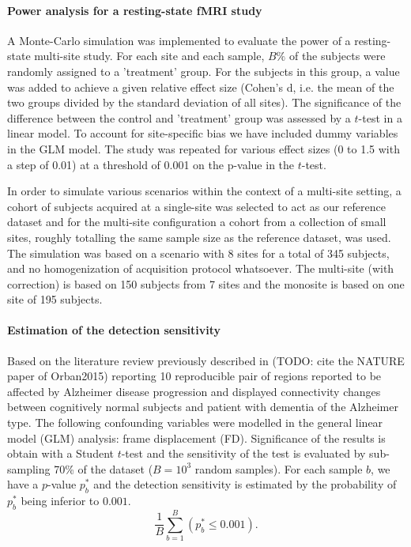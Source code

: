 \documentclass[authoryear]{elsarticle}
\begin{document}
\paragraph{Power analysis for a resting-state fMRI study}
A Monte-Carlo simulation was implemented to evaluate the power of a resting-state multi-site study. For each site and each sample, $B\%$ of the subjects were randomly assigned to a 'treatment' group. For the subjects in this group, a value was added to achieve a given relative effect size (Cohen's d, i.e. the mean of the two groups divided by the standard deviation of all sites). The significance of the difference between the control and 'treatment' group was assessed by a $t$-test in a linear model. To account for site-specific bias we have included dummy variables in the GLM model. The study was repeated for various effect sizes (0 to 1.5 with a step of 0.01) at a threshold of 0.001 on the p-value in the $t$-test.

In order to simulate various scenarios within the context of a multi-site setting, a cohort of subjects acquired at a single-site was selected to act as our reference dataset and for the multi-site configuration a cohort from a collection of small sites, roughly totalling the same sample size as the reference dataset, was used. The simulation was based on a scenario with 8 sites for a total of 345 subjects, and no homogenization of acquisition protocol whatsoever. The multi-site (with correction) is based on 150 subjects from 7 sites and the monosite is based on 
one site of 195 subjects.  


\paragraph{Estimation of the detection sensitivity}
Based on the literature review previously described in (TODO: cite the NATURE paper of Orban2015) reporting 10 reproducible pair of regions reported to be affected by Alzheimer disease progression and displayed connectivity changes between cognitively normal subjects and patient with dementia of the Alzheimer type. The following confounding variables were modelled in the general linear model (GLM) analysis: frame displacement (FD). Significance of the results is obtain with a Student $t$-test and the sensitivity of the test is evaluated by sub-sampling 70\% of the dataset ($B=10^3$ random samples). For each sample $b$, we have a $p$-value $p^{*}_b$ and the detection sensitivity is estimated by the probability of $p^{*}_b$ being inferior to $0.001$.
\begin{equation}\label{Detection power}  
    \frac{1}{B}\sum\limits_{b=1}^B\left(p^{*}_b\leq0.001\right).
\end{equation}
\end{document}
